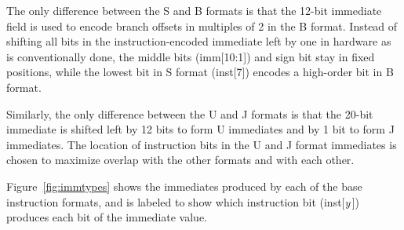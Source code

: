 The only difference between the S and B formats is that the 12-bit
immediate field is used to encode branch offsets in multiples of 2 in
the B format.  Instead of shifting all bits in the
instruction-encoded immediate left by one in hardware as is
conventionally done, the middle bits (imm[10:1]) and sign bit stay in
fixed positions, while the lowest bit in S format (inst[7]) encodes a
high-order bit in B format.

Similarly, the only difference between the U and J formats is
that the 20-bit immediate is shifted left by 12 bits to form U
immediates and by 1 bit to form J immediates.  The location of
instruction bits in the U and J format immediates is chosen to
maximize overlap with the other formats and with each other.

Figure~\ref{fig:immtypes} shows the immediates produced by each of the
base instruction formats, and is labeled to show which instruction
bit (inst[{\em y}\,]) produces each bit of the immediate value.


